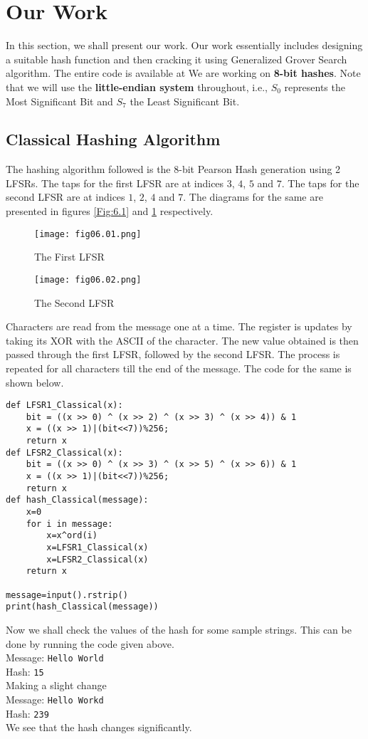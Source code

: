 \section{Our Work}
In this section, we shall present our work. Our work essentially includes designing a suitable hash function and then cracking it using Generalized Grover Search algorithm. The entire code is available at %
We are working on \textbf{8-bit hashes}. Note that we will use the \textbf{little-endian system} throughout, i.e., $S_0$ represents the Most Significant Bit and $S_7$ the Least Significant Bit.
\subsection{Classical Hashing Algorithm}
The hashing algorithm followed is the 8-bit Pearson Hash generation using 2 LFSRs. The taps for the first LFSR are at indices $3$, $4$, $5$ and $7$. The taps for the second LFSR are at indices $1$, $2$, $4$ and $7$. The diagrams for the same are presented in figures \ref{Fig:6.1} and \ref{Fig:6.2} respectively.
\begin{figure}[!htb]
   \begin{minipage}{\textwidth}
     \centering
     \texttt{[image: fig06.01.png]}
     \caption{The First LFSR}
     \label{Fig:6.1}
   \end{minipage}
   \begin{minipage}{\textwidth}
     \centering
     \texttt{[image: fig06.02.png]}
     \caption{The Second LFSR}
     \label{Fig:6.2}
   \end{minipage}
\end{figure}
Characters are read from the message one at a time. The register is updates by taking its XOR with the ASCII of the character. The new value obtained is then passed through the first LFSR, followed by the second LFSR. The process is repeated for all characters till the end of the message. The code for the same is shown below.
\begin{lstlisting}
def LFSR1_Classical(x):
    bit = ((x >> 0) ^ (x >> 2) ^ (x >> 3) ^ (x >> 4)) & 1
    x = ((x >> 1)|(bit<<7))%256;
    return x
def LFSR2_Classical(x):
    bit = ((x >> 0) ^ (x >> 3) ^ (x >> 5) ^ (x >> 6)) & 1
    x = ((x >> 1)|(bit<<7))%256;
    return x
def hash_Classical(message):
    x=0
    for i in message:
        x=x^ord(i)
        x=LFSR1_Classical(x)
        x=LFSR2_Classical(x)
    return x

message=input().rstrip()
print(hash_Classical(message))
\end{lstlisting}
Now we shall check the values of the hash for some sample strings. This can be done by running the code given above.\\
Message: \verb|Hello World|\\
Hash: \verb|15|\\
Making a slight change\\
Message: \verb|Hello Workd|\\
Hash: \verb|239|\\
We see that the hash changes significantly.

